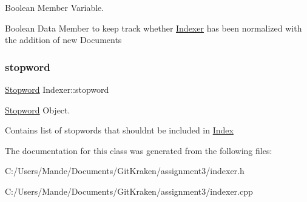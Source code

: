 Boolean Member Variable. 

Boolean Data Member to keep track whether \hyperlink{class_indexer}{Indexer} has been normalized with the addition of new Documents \mbox{\label{class_indexer_af6f4a98f2cd0bb95f22203902ed2349d}} 
\subsubsection{\texorpdfstring{stopword}{stopword}}
{\footnotesize\ttfamily \hyperlink{class_stopword}{Stopword} Indexer\+::stopword\hspace{0.3cm}{\ttfamily [protected]}}



\hyperlink{class_stopword}{Stopword} Object. 

Contains list of stopwords that shouldn\textquotesingle{}t be included in \hyperlink{class_index}{Index} 

The documentation for this class was generated from the following files\+:\begin{DoxyCompactItemize}
\item 
C\+:/\+Users/\+Mande/\+Documents/\+Git\+Kraken/assignment3/indexer.\+h\item 
C\+:/\+Users/\+Mande/\+Documents/\+Git\+Kraken/assignment3/indexer.\+cpp\end{DoxyCompactItemize}
